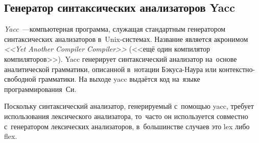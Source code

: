 \subsection{Генератор синтаксических анализаторов Yacc} \label{sub117}

\textit{Yacc}~---компьютерная программа, служащая стандартным генератором синтаксических анализаторов в~Unix-системах. Название является акронимом \textit{<<Yet Another Compiler Compiler>>} (<<ещё один компилятор компиляторов>>). Yacc генерирует синтаксический анализатор на~основе аналитической грамматики, описанной в~нотации Бэкуса-Наура или контекстно-свободной грамматики. На выходе yacc выдаётся код на~языке программирования~Си.

Поскольку синтаксический анализатор, генерируемый с~помощью yacc, требует использования лексического анализатора, то~часто он используется совместно с~генератором лексических анализаторов, в~большинстве случаев это lex либо flex. 

